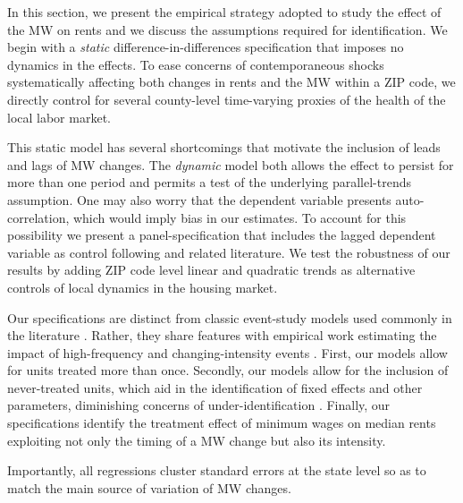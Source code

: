 
In this section, we present the empirical strategy adopted to study the effect of the 
MW on rents and we discuss the assumptions required for identification. We begin with 
a \textit{static} difference-in-differences specification that imposes no dynamics in 
the effects. To ease concerns of contemporaneous shocks systematically affecting both 
changes in rents and the MW within a ZIP code, we directly control for several 
county-level time-varying proxies of the health of the local labor market.

This static model has several shortcomings that motivate the inclusion of leads and 
lags of MW changes. The \textit{dynamic} model both allows the effect to persist for 
more than one period and permits a test of the underlying parallel-trends assumption. 
One may also worry that the dependent variable presents auto-correlation, which would 
imply bias in our estimates. To account for this possibility we present a 
panel-specification that includes the lagged dependent variable as control following 
\textcite{ArellanoBond1991} and related literature. We test the robustness of our 
results by adding ZIP code level linear and quadratic trends as alternative controls 
of local dynamics in the housing market. 

Our specifications are distinct from classic event-study models used commonly in the 
literature \parencite[discussed in, e.g.,][]{BorusyakJaravel2017, abraham2018}. Rather, 
they share features with empirical work estimating the impact of high-frequency and 
changing-intensity events \parencite[see, e.g.,][]{Fuest2018, Suarez2016}.
First, our models allow for units treated more than once. Secondly, our models allow 
for the inclusion of never-treated units, which aid in the identification of fixed 
effects and other parameters, diminishing concerns of under-identification 
\parencite{BorusyakJaravel2017}. Finally, our specifications identify the treatment 
effect of minimum wages on median rents exploiting not only the timing of a MW change 
but also its intensity.

Importantly, all regressions cluster standard errors at the state level so as to match 
the main source of variation of MW changes.

    
